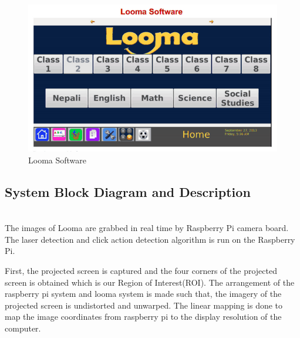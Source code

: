 \documentclass[12pt, a4paper]{article}
\begin{document}
\begin{figure}[htp]
	\centering
		\includegraphics[scale=0.3]{loomasoftware.png}
	\caption{Looma Software}
\label{}
\end{figure}

\subsection{System Block Diagram and Description}
~\\
The images of Looma are grabbed in real time by Raspberry Pi camera board. The laser detection and click action detection algorithm is run on the Raspberry Pi.

First, the projected screen is captured and the four corners of the projected screen is obtained which is our Region of Interest(ROI). The arrangement of the raspberry pi system and looma system is made such that, the imagery of the projected screen is undistorted and unwarped. The linear mapping is done to map the image coordinates from raspberry pi to the display resolution of the computer.
\newpage
\end{document}
